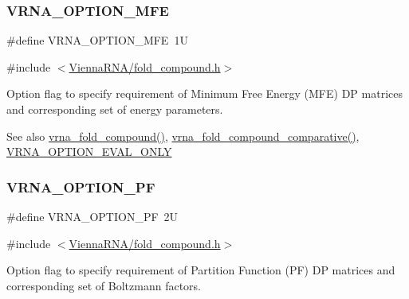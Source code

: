 \subsubsection{\texorpdfstring{V\+R\+N\+A\+\_\+\+O\+P\+T\+I\+O\+N\+\_\+\+M\+FE}{VRNA\_OPTION\_MFE}}
{\footnotesize\ttfamily \#define V\+R\+N\+A\+\_\+\+O\+P\+T\+I\+O\+N\+\_\+\+M\+FE~1U}



{\ttfamily \#include $<$\hyperlink{fold__compound_8h}{Vienna\+R\+N\+A/fold\+\_\+compound.\+h}$>$}



Option flag to specify requirement of Minimum Free Energy (M\+FE) DP matrices and corresponding set of energy parameters. 

\begin{DoxySeeAlso}{See also}
\hyperlink{group__fold__compound_ga6601d994ba32b11511b36f68b08403be}{vrna\+\_\+fold\+\_\+compound()}, \hyperlink{group__fold__compound_gad6bacc816af274922b13d947f708aa0c}{vrna\+\_\+fold\+\_\+compound\+\_\+comparative()}, \hyperlink{group__fold__compound_ga61469c423131552c8483229f8b6c7e0e}{V\+R\+N\+A\+\_\+\+O\+P\+T\+I\+O\+N\+\_\+\+E\+V\+A\+L\+\_\+\+O\+N\+LY} 
\end{DoxySeeAlso}
\mbox{\label{group__fold__compound_gabfbadcddda3e74ce7f49035ef8f058f7}} 
\subsubsection{\texorpdfstring{V\+R\+N\+A\+\_\+\+O\+P\+T\+I\+O\+N\+\_\+\+PF}{VRNA\_OPTION\_PF}}
{\footnotesize\ttfamily \#define V\+R\+N\+A\+\_\+\+O\+P\+T\+I\+O\+N\+\_\+\+PF~2U}



{\ttfamily \#include $<$\hyperlink{fold__compound_8h}{Vienna\+R\+N\+A/fold\+\_\+compound.\+h}$>$}



Option flag to specify requirement of Partition Function (PF) DP matrices and corresponding set of Boltzmann factors. 

